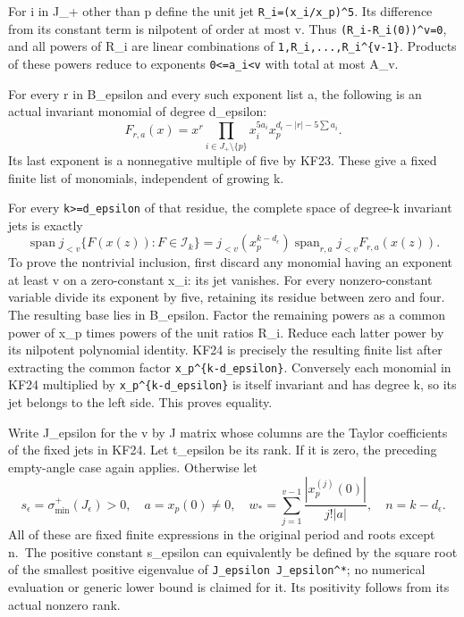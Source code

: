 \documentclass[11pt]{article}
\begin{document}
For i in J\_+ other than p define the unit jet \texttt{R\_i=(x\_i/x\_p)\^{}5}. Its difference from its constant term is nilpotent of order at most v. Thus \nolinkurl{(R_i-R_i(0))^v=0}, and all powers of R\_i are linear combinations of \nolinkurl{1,R_i,...,R_i^{v-1}}. Products of these powers reduce to exponents \texttt{0\textless{}=a\_i\textless{}v} with total at most A\_v.

For every r in B\_epsilon and every such exponent list a, the following is an actual invariant monomial of degree d\_epsilon: \[
F_{r,a}(x)=x^r\prod_{i\in J_+\setminus\{p\}}x_i^{5a_i}
 x_p^{d_\epsilon-|r|-5\sum a_i}.
\tag{KF24}
\] Its last exponent is a nonnegative multiple of five by KF23. These give a fixed finite list of monomials, independent of growing k.

For every \texttt{k\textgreater{}=d\_epsilon} of that residue, the complete space of degree-k invariant jets is exactly \[
\boxed{\operatorname{span}j_{<v}\{F(x(z)):F\in\mathscr I_k\}
=j_{<v}(x_p^{k-d_\epsilon})
 \operatorname{span}_{r,a}j_{<v}F_{r,a}(x(z)).}
\tag{KF25}
\] To prove the nontrivial inclusion, first discard any monomial having an exponent at least v on a zero-constant x\_i: its jet vanishes. For every nonzero-constant variable divide its exponent by five, retaining its residue between zero and four. The resulting base lies in B\_epsilon. Factor the remaining powers as a common power of x\_p times powers of the unit ratios R\_i. Reduce each latter power by its nilpotent polynomial identity. KF24 is precisely the resulting finite list after extracting the common factor \nolinkurl{x_p^{k-d_epsilon}}. Conversely each monomial in KF24 multiplied by \nolinkurl{x_p^{k-d_epsilon}} is itself invariant and has degree k, so its jet belongs to the left side. This proves equality.

Write J\_epsilon for the v by J matrix whose columns are the Taylor coefficients of the fixed jets in KF24. Let t\_epsilon be its rank. If it is zero, the preceding empty-angle case again applies. Otherwise let \[
s_\epsilon=\sigma_{\min}^+(J_\epsilon)>0,\quad
a=x_p(0)\ne0,\quad
w_* =\sum_{j=1}^{v-1}\frac{|x_p^{(j)}(0)|}{j!|a|},
\quad n=k-d_\epsilon.
\tag{KF26}
\] All of these are fixed finite expressions in the original period and roots except n.~The positive constant s\_epsilon can equivalently be defined by the square root of the smallest positive eigenvalue of \nolinkurl{J_epsilon J_epsilon^*}; no numerical evaluation or generic lower bound is claimed for it. Its positivity follows from its actual nonzero rank.
\end{document}
